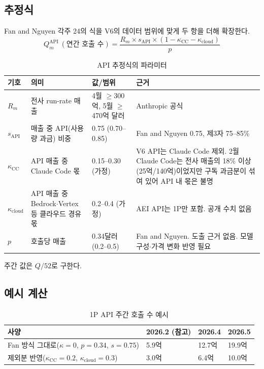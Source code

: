 \documentclass[11pt]{article}
\begin{document}
\subsection{추정식}

Fan and Nguyen 각주 24의 식을 V6의 데이터 범위에 맞게 두 항을 더해 확장한다.
\begin{equation*}
Q^{\text{API}}_m\ (\text{연간 호출 수}) = \frac{R_m \times s_{\text{API}} \times (1-\kappa_{\text{CC}}-\kappa_{\text{cloud}})}{p}
\end{equation*}

\begin{longtable}{L{1.4cm}L{3.8cm}L{3.2cm}L{6.2cm}}
\caption{API 추정식의 파라미터}\label{tab:apiparam}\\
\toprule
기호 & 의미 & 값/범위 & 근거 \\
\midrule
\endhead
$R_m$ & 전사 run-rate 매출 & 4월 $\geq$300억, 5월 $\geq$470억 달러 & Anthropic 공식 \\
$s_{\text{API}}$ & 매출 중 API(사용량 과금) 비중 & 0.75 (0.70--0.85) & Fan and Nguyen 0.75, 제3자 75--85\% \\
$\kappa_{\text{CC}}$ & API 매출 중 Claude Code 몫 & 0.15--0.30 (가정) & V6 API는 Claude Code 제외. 2월 Claude Code는 전사 매출의 18\% 이상(25억/140억)이었지만 구독 과금분이 섞여 있어 API 내 몫은 불명 \\
$\kappa_{\text{cloud}}$ & API 매출 중 Bedrock$\cdot$Vertex 등 클라우드 경유 몫 & 0.2--0.4 (가정) & AEI API는 1P만 포함. 공개 수치 없음 \\
$p$ & 호출당 매출 & 0.34달러 (0.2--0.5) & Fan and Nguyen. 도출 근거 없음. 모델 구성$\cdot$가격 변화 반영 필요 \\
\bottomrule
\end{longtable}

주간 값은 $Q/52$로 구한다.

\subsection{예시 계산}

\begin{longtable}{L{6.4cm}L{2.6cm}L{2.6cm}L{2.6cm}}
\caption{1P API 주간 호출 수 예시}\label{tab:apiex}\\
\toprule
사양 & 2026.2 (참고) & 2026.4 & 2026.5 \\
\midrule
\endhead
Fan 방식 그대로($\kappa=0$, $p=0.34$, $s=0.75$) & 5.9억 & 12.7억 & 19.9억 \\
제외분 반영($\kappa_{\text{CC}}=0.2$, $\kappa_{\text{cloud}}=0.3$) & 3.0억 & 6.4억 & 10.0억 \\
\bottomrule
\end{longtable}
\end{document}
